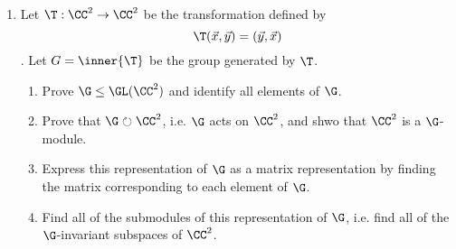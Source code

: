 \documentclass{math174}
\date{Monday, February 4}
\author{}
\begin{document}
\begin{enumerate}
\item Let $\T : \CC^2 \to \CC^2$ be the transformation defined by
  \[\T(\vec{x}, \vec{y}) = (\vec{y}, \vec{x})\].
  Let $G = \inner{\T}$ be the group generated by $\T$.
  \begin{enumerate}
    \item Prove $\G \le \GL(\CC^2)$ and identify all elements of $\G$.
      \begin{solution}
      \end{solution}
    \item Prove that $\G \circlearrowright \CC^2$, i.e. $\G$ acts on $\CC^2$,
      and shwo that $\CC^2$ is a $\G$-module.
      \begin{solution}
      \end{solution}
    \item Express this representation of $\G$ as a matrix representation by
      finding the matrix corresponding to each element of $\G$.
      \begin{solution}
      \end{solution}
    \item Find all of the submodules of this representation of $\G$, i.e. find
      all of the $\G$-invariant subspaces of $\CC^2$.
  \end{enumerate}
\end{enumerate}
\end{document}
